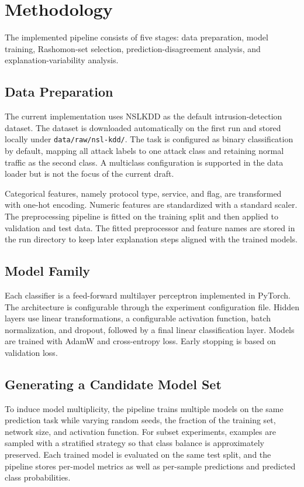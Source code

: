 \section{Methodology}

The implemented pipeline consists of five stages: data preparation, model training, Rashomon-set selection, prediction-disagreement analysis, and explanation-variability analysis. 

\subsection{Data Preparation}

The current implementation uses \gls{NSLKDD} as the default intrusion-detection dataset. The dataset is downloaded automatically on the first run and stored locally under \texttt{data/raw/nsl-kdd/}. The task is configured as binary classification by default, mapping all attack labels to one attack class and retaining normal traffic as the second class. A multiclass configuration is supported in the data loader but is not the focus of the current draft.

Categorical features, namely protocol type, service, and flag, are transformed with one-hot encoding. Numeric features are standardized with a standard scaler. The preprocessing pipeline is fitted on the training split and then applied to validation and test data. The fitted preprocessor and feature names are stored in the run directory to keep later explanation steps aligned with the trained models.

\subsection{Model Family}

Each classifier is a feed-forward multilayer perceptron implemented in PyTorch. The architecture is configurable through the experiment configuration file. Hidden layers use linear transformations, a configurable activation function, batch normalization, and dropout, followed by a final linear classification layer. Models are trained with AdamW and cross-entropy loss. Early stopping is based on validation loss.

\subsection{Generating a Candidate Model Set}

To induce model multiplicity, the pipeline trains multiple models on the same prediction task while varying random seeds, the fraction of the training set, network size, and activation function. For subset experiments, examples are sampled with a stratified strategy so that class balance is approximately preserved. Each trained model is evaluated on the same test split, and the pipeline stores per-model metrics as well as per-sample predictions and predicted class probabilities.

